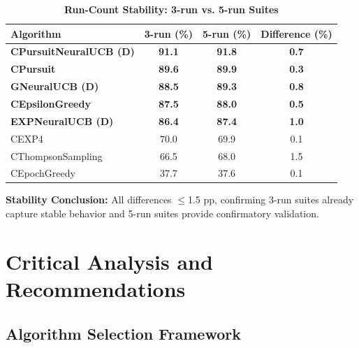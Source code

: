 \documentclass[12pt,a4paper]{article}
\newcommand{\success}[1]{\textcolor{successcolor}{\textbf{#1}}}
\newcommand{\legacy}[1]{\textcolor{legacycolor}{\textbf{#1}}}
\newcommand{\neural}[1]{\textcolor{neuralcolor}{\textbf{#1}}}
\begin{document}
\begin{table}[H]
\centering
\caption{\success{Run-Count Stability: 3-run vs. 5-run Suites}}
\begin{tabular}{|l|c|c|c|}
\hline
\textbf{Algorithm} & \textbf{3-run (\%)} & \textbf{5-run (\%)} & \textbf{Difference (\%)} \\
\hline
\hline
\neural{CPursuitNeuralUCB (D)}  & \neural{91.1}     & \neural{91.8}     & \neural{0.7} \\
\success{CPursuit}              & \success{89.6}     & \success{89.9}     & \success{0.3} \\
\neural{GNeuralUCB (D)}         & \neural{88.5}     & \neural{89.3}     & \neural{0.8} \\
\success{CEpsilonGreedy}        & \success{87.5}     & \success{88.0}     & \success{0.5} \\
\legacy{EXPNeuralUCB (D)}       & \legacy{86.4}     & \legacy{87.4}     & \legacy{1.0} \\
CEXP4                          & 70.0              & 69.9              & 0.1 \\
CThompsonSampling              & 66.5              & 68.0              & 1.5 \\
CEpochGreedy                   & 37.7              & 37.6              & 0.1 \\
\hline
\end{tabular}
\end{table}

\textbf{Stability Conclusion:} All differences $\leq$1.5 pp, confirming 3-run suites already capture stable behavior and 5-run suites provide confirmatory validation.

\newpage
\section{Critical Analysis and Recommendations}

\subsection{Algorithm Selection Framework}
\end{document}
